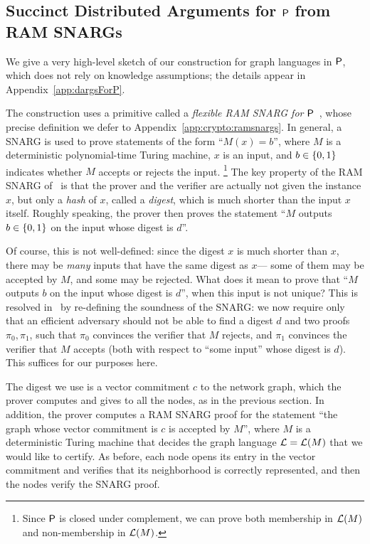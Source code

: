 \subsection{Succinct Distributed Arguments for ${\mathsf{P}}$ from RAM SNARGs}\label{sec:dargsForP}
We give a very high-level sketch of our construction for graph languages in ${\mathsf{P}}$,
which does not rely on knowledge assumptions; the details appear in Appendix~\ref{app:dargsForP}.

The construction uses a primitive called a \emph{flexible RAM SNARG for ${\mathsf{P}}$}~\cite{KP16,cryptoeprint:2022/1320},
whose precise definition we defer to Appendix~\ref{app:crypto:ramsnargs}.
In general, a %
SNARG is used to prove statements of the form ``$M(x) = b$'',
where $M$ is a deterministic polynomial-time Turing machine, $x$ is an input,
and $b \in \left \{{0,1} \right \}$ indicates whether $M$ accepts or rejects the input.%
\footnote{Since ${\mathsf{P}}$ is closed under complement, we can prove both membership in $\mathcal{L}(M)$
and non-membership in $\mathcal{L}(M)$.}
The key property of the RAM SNARG of~\cite{KP16,cryptoeprint:2022/1320} is that 
the prover and the verifier
are actually not given the instance $x$,
but only a \emph{hash} of $x$, called a \emph{digest},
which is much shorter than the input $x$ itself.
Roughly speaking, the prover then proves the statement ``$M$ outputs $b \in \left \{{0,1} \right \}$
on the input whose digest is $d$''.

Of course, this is not well-defined: since the digest $x$ is much shorter than $x$,
there may be \emph{many} inputs that have the same digest as $x$---%
some of them may be accepted by $M$, and some may be rejected.
What does it mean to prove that ``$M$ outputs $b$ on the input whose digest is $d$'',
when this input is not unique?
This is resolved in~\cite{KP16} by re-defining
the soundness of the SNARG:
we now require only that 
an
efficient adversary should not be able to find a digest $d$ and two proofs $\pi_0, \pi_1$,
such that $\pi_0$ convinces the verifier that $M$ rejects,
and $\pi_1$ convinces the verifier that $M$ accepts (both with respect to ``some input'' whose digest is $d$).
This suffices for our purposes here.

The digest we use is a vector commitment $c$ to the network graph, which the prover
computes and gives to all the nodes, as in the previous section.
In addition, the prover computes a RAM SNARG proof for the statement ``the graph whose vector commitment
is $c$ is accepted by $M$'', where $M$ is a deterministic Turing machine that decides
the graph language $\mathcal{L} = \mathcal{L}(M)$ that we would like to certify.
As before, each node opens its entry in the vector commitment and verifies that its neighborhood
is correctly represented, and then the nodes verify the SNARG proof.

